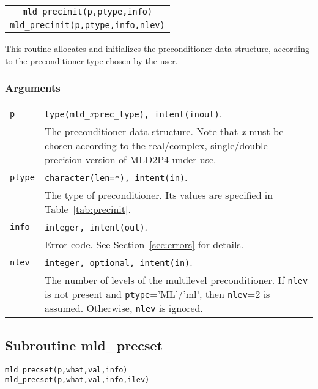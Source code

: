 \begin{center}
\begin{tabular}{|c|}
\hline
\verb|mld_precinit(p,ptype,info)|\\
\verb|mld_precinit(p,ptype,info,nlev)|\\
\hline
\end{tabular}
\end{center}

\noindent
This routine allocates and initializes the preconditioner data structure,
according to the preconditioner type chosen by the user.

\subsubsection*{Arguments}

\begin{tabular}{p{1.2cm}p{11.5cm}}
\verb|p|      & \verb|type(mld_|\emph{x}\verb|prec_type), intent(inout)|.\\
              & The preconditioner data structure. Note that \emph{x} must be chosen according
                to the real/complex, single/double precision version of MLD2P4 under use.\\
\verb|ptype|  & \verb|character(len=*), intent(in)|.\\
              & The type of preconditioner. Its values are specified in Table~\ref{tab:precinit}.\\
\verb|info|   & \verb|integer, intent(out)|.\\
              & Error code. See Section~\ref{sec:errors} for details.\\
\verb|nlev|   & \verb|integer, optional, intent(in)|.\\
              & The number of levels of the multilevel preconditioner.
                If \verb|nlev| is not present and \verb|ptype|='ML'/'ml', 
                then \verb|nlev|=2 is assumed. Otherwise, \verb|nlev| is ignored.
\end{tabular}


\subsection{Subroutine mld\_precset\label{sec:precset}}

\begin{center}
\verb|mld_precset(p,what,val,info)|\\
\verb|mld_precset(p,what,val,info,ilev)|
\end{center}

